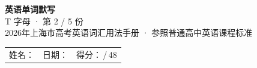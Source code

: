 \documentclass[10pt,a4paper]{article}
\begin{document}
\pagestyle{plain}

\begin{center}
{\LARGE\bfseries 英语单词默写}\\[0.22em]
{\large T 字母 · 第 2 / 5 份}\\[0.18em]
{\small 2026年上海市高考英语词汇用法手册 · 参照普通高中英语课程标准}
\end{center}

\vspace{0.25em}
\noindent\begin{tabular}{@{}p{}@{}p{}@{}p{}@{}}
姓名：\underline{\hspace{2.0cm}} & 日期：\underline{\hspace{2.0cm}} & 得分：\underline{\hspace{1.3cm}}\,/\,48 \\
\end{tabular}

\vspace{0.3em}

\vspace{0.08em}
\end{document}
